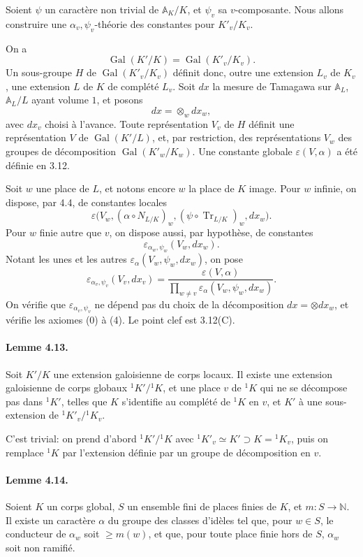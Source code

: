 \documentclass[10pt]{article}
\newcommand{\Gal}{\operatorname{Gal}}
\newcommand{\Tr}{\operatorname{Tr}}
\providecommand{\Gal}{\operatorname{Gal}}
\providecommand{\Gal}{\operatorname{Gal}}
\providecommand{\Tr}{\operatorname{Tr}}
\providecommand{\Gal}{\operatorname{Gal}}
\providecommand{\Tr}{\operatorname{Tr}}
\providecommand{\Gal}{\operatorname{Gal}}
\providecommand{\Tr}{\operatorname{Tr}}
\begin{document}
Soient \(\psi\) un caractère non trivial de \(\mathbb A_K/K\), et \(\psi_v\) sa \(v\)-composante. Nous allons construire une \(\alpha_v,\psi_v\)-théorie des constantes pour \(K'_v/K_v\).

On a
\[
\Gal(K'/K)=\Gal(K'_v/K_v).
\]
Un sous-groupe \(H\) de \(\Gal(K'_v/K_v)\) définit donc, outre une extension \(L_v\) de \(K_v\), une extension \(L\) de \(K\) de complété \(L_v\). Soit \(dx\) la mesure de Tamagawa sur \(\mathbb A_L\), \(\mathbb A_L/L\) ayant volume \(1\), et posons
\[
dx=\otimes_w dx_w,
\]
avec \(dx_v\) choisi à l'avance. Toute représentation \(V_v\) de \(H\) définit une représentation \(V\) de \(\Gal(K'/L)\), et, par restriction, des représentations \(V_w\) des groupes de décomposition \(\Gal(K'_w/K_w)\). Une constante globale \(\varepsilon(V,\alpha)\) a été définie en 3.12.

Soit \(w\) une place de \(L\), et notons encore \(w\) la place de \(K\) image. Pour \(w\) infinie, on dispose, par 4.4, de constantes locales
\[
\varepsilon\bigl(V_w,(\alpha\circ N_{L/K})_w,
(\psi\circ\Tr_{L/K})_w,dx_w\bigr).
\]
Pour \(w\) finie autre que \(v\), on dispose aussi, par hypothèse, de constantes
\[
\varepsilon_{\alpha_w,\psi_w}(V_w,dx_w).
\]
Notant les unes et les autres \(\varepsilon_\alpha(V_w,\psi_w,dx_w)\), on pose
\[
\varepsilon_{\alpha_v,\psi_v}(V_v,dx_v)
=
\frac{\varepsilon(V,\alpha)}
{\displaystyle\prod_{w\ne v}\varepsilon_\alpha(V_w,\psi_w,dx_w)}.
\]
On vérifie que \(\varepsilon_{\alpha_v,\psi_v}\) ne dépend pas du choix de la décomposition \(dx=\otimes dx_w\), et vérifie les axiomes (0) à (4). Le point clef est 3.12(C).

\paragraph{Lemme 4.13.} Soit \(K'/K\) une extension galoisienne de corps locaux. Il existe une extension galoisienne de corps globaux \(^{1}K'/{}^{1}K\), et une place \(v\) de \(^{1}K\) qui ne se décompose pas dans \(^{1}K'\), telles que \(K\) s'identifie au complété de \(^{1}K\) en \(v\), et \(K'\) à une sous-extension de \(^{1}K'_v/{}^{1}K_v\).

C'est trivial: on prend d'abord \(^{1}K'/{}^{1}K\) avec \(^{1}K'_v\simeq K'\supset K={}^{1}K_v\), puis on remplace \(^{1}K\) par l'extension définie par un groupe de décomposition en \(v\).

\paragraph{Lemme 4.14.} Soient \(K\) un corps global, \(S\) un ensemble fini de places finies de \(K\), et \(m:S\to\mathbb N\). Il existe un caractère \(\alpha\) du groupe des classes d'idèles tel que, pour \(w\in S\), le conducteur de \(\alpha_w\) soit \(\ge m(w)\), et que, pour toute place finie hors de \(S\), \(\alpha_w\) soit non ramifié.
\end{document}

